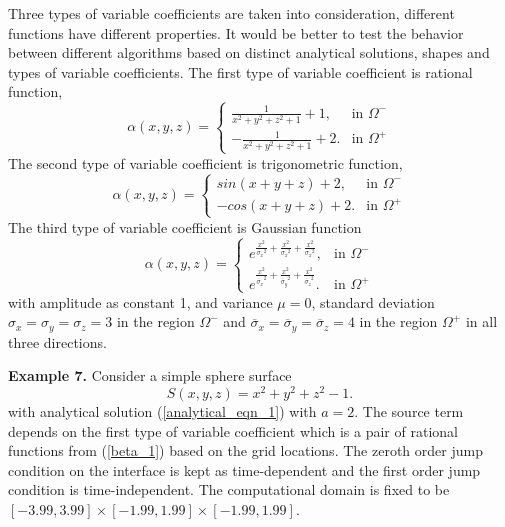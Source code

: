 \documentclass[dissertation]{uathesis}
\begin{document}
\begin{body}
\begin{flushleft}
\hspace{1cm} Three types of variable coefficients are taken into consideration, different functions have different properties. It would be better to test the behavior between different algorithms based on distinct analytical solutions, shapes and types of variable coefficients. The first type of variable coefficient is rational function, 
\begin{equation} \label{beta_1}
\alpha(x, y, z)= 
\begin{cases}
\frac{1}{x^2 + y^2 + z^2 + 1} + 1,  &\mbox{in } \Omega^{-} \\
-\frac{1}{x^2 + y^2 + z^2 + 1} + 2.  &\mbox{in } \Omega^{+}
\end{cases}
\end{equation}
The second type of variable coefficient is trigonometric function,
\begin{equation} \label{beta_2}
\alpha(x, y, z)= 
\begin{cases}
sin(x + y + z) +2,   &\mbox{in } \Omega^{-} \\
-cos(x + y + z) + 2.  &\mbox{in } \Omega^{+}
\end{cases}
\end{equation}
The third type of variable coefficient is Gaussian function
\begin{equation} \label{beta_3}
\alpha(x, y, z)= 
\begin{cases}
e^{\frac{x^2}{{\sigma_x}^2} + \frac{x^2}{{\sigma_x}^2} + \frac{x^2}{{\sigma_x}^2}},  &\mbox{in } \Omega^{-} \\
e^{\frac{x^2}{{\overline{\sigma}_x}^2} + \frac{x^2}{{\overline{\sigma}_y}^2} + \frac{x^2}{{\overline{\sigma}_z}^2}}.  &\mbox{in } \Omega^{+}
\end{cases}
\end{equation}
with amplitude as constant 1, and variance $\mu = 0$, standard deviation $\sigma_x=\sigma_y=\sigma_z=3$ in the region $\Omega^{-}$ and ${\overline{\sigma}_x}={\overline{\sigma}_y}={\overline{\sigma}_z}=4$ in the region $\Omega^{+}$ in all three directions.

{\flushleft \bf Example 7.} Consider a simple sphere surface
% 
\begin{equation} \label{sphere}
S(x,y,z) = x^{2} + y^{2} + z^{2} -1.
\end{equation}
%
with analytical solution (\ref{analytical_eqn_1}) with $a=2$. The source term depends on the first type of variable coefficient which is a pair of rational functions from (\ref{beta_1}) based on the grid locations. The zeroth order jump condition on the interface is kept as time-dependent and the first order jump condition is time-independent. The computational domain is fixed to be $[-3.99,3.99]\times[-1.99,1.99]\times[-1.99,1.99]$. 


\end{flushleft}
\end{body}
\end{document}
